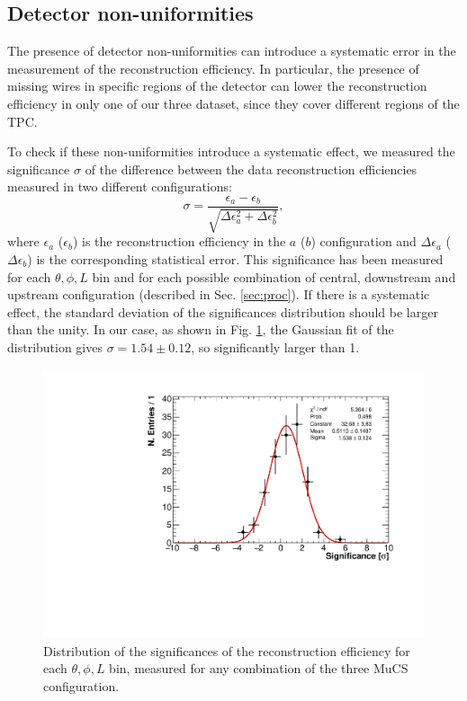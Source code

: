 \documentclass[a4paper]{scrartcl}
\begin{document}
\subsection{Detector non-uniformities}\label{sec:wires}
The presence of detector non-uniformities can introduce a systematic error in the measurement of the reconstruction efficiency. In particular, the presence of missing wires in specific regions of the detector can lower the reconstruction efficiency in only one of our three dataset, since they cover different regions of the TPC.

To check if these non-uniformities introduce a systematic effect, we measured the significance $\sigma$ of the difference between the data reconstruction efficiencies measured in two different configurations:
\begin{equation}
\sigma = \frac{\epsilon_a-\epsilon_b}{\sqrt{\Delta \epsilon_{a}^2 + \Delta \epsilon_b^2}},
\end{equation}
where $\epsilon_{a}$ ($\epsilon_{b}$) is the reconstruction efficiency in the $a$ ($b$) configuration and $\Delta \epsilon_{a}$ ($\Delta \epsilon_{b}$) is the corresponding statistical error. This significance has been measured for each $\theta,\phi,L$ bin and for each possible combination of central, downstream and upstream configuration (described in Sec. \ref{sec:proc}). If there is a systematic effect, the standard deviation of the significances distribution should be larger than the unity. In our case, as shown in Fig. \ref{fig:significance}, the Gaussian fit of the distribution gives $\sigma = 1.54\pm0.12$, so significantly larger than 1.

\begin{figure}[htbp]
  \begin{center}
    \includegraphics[width=0.7\linewidth]{figures/significance.pdf}
    \caption{Distribution of the significances of the reconstruction efficiency for each $\theta,\phi,L$ bin, measured for any combination of the three MuCS configuration.} \label{fig:significance}
  \end{center}
\end{figure}
\end{document}
